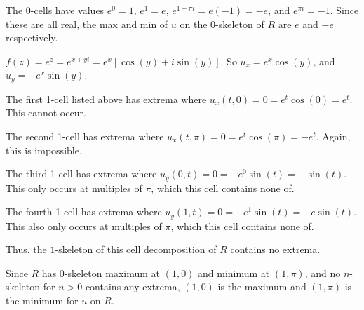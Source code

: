 \documentclass{article}
\theoremstyle{definition}
\newcommand{\sq}[1]{\left[#1\right]}
\begin{document}
The $0$-cells have values $e^0=1$, $e^1=e$, $e^{1+\pi i}=e(-1)=-e$, and $e^{\pi i}=-1$.
Since these are all real, the max and min of $u$ on the $0$-skeleton 
of $R$ are $e$ and $-e$ respectively.

$f(z) = e^z = e^{x+yi} = e^x \sq{\cos(y)+i\sin(y)}$. So 
$u_x = e^x \cos(y)$, and $u_y = -e^x \sin(y)$. 

The first 1-cell listed above has extrema where
$u_x(t,0) = 0 = e^t \cos(0) = e^t$. This cannot occur.

The second 1-cell has extrema where
$u_x(t,\pi) = 0 = e^t \cos(\pi) = -e^t$. Again, this is impossible.

The third 1-cell has extrema where
$u_y(0,t) = 0 = -e^0 \sin(t) = - \sin (t)$. This only occurs at multiples
of $\pi$, which this cell contains none of.

The fourth 1-cell has extrema where
$u_y(1,t) = 0 = -e^1 \sin(t) = -e \sin(t)$. This also only occurs at multiples
of $\pi$, which this cell contains none of.

Thus, the $1$-skeleton of this cell decomposition of $R$ contains no extrema.

Since $R$ has $0$-skeleton maximum at $(1,0)$ and minimum at $(1,\pi)$, 
and no $n$-skeleton for $n>0$ contains any extrema, $(1,0)$ is the maximum
and $(1,\pi)$ is the minimum for $u$ on $R$.
\end{document}
